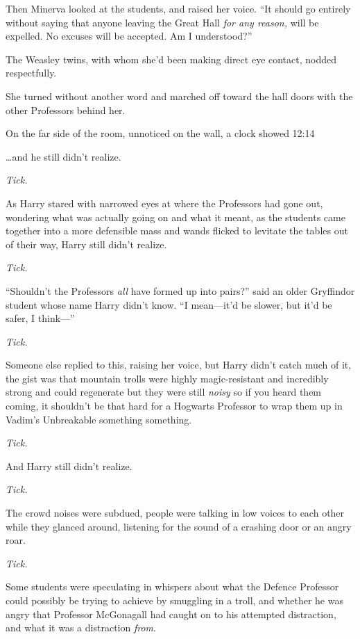 Then Minerva looked at the students, and raised her voice. “It should go entirely without saying that anyone leaving the Great Hall \emph{for any reason,} will be expelled. No excuses will be accepted. Am I understood?”

The Weasley twins, with whom she’d been making direct eye contact, nodded respectfully.

She turned without another word and marched off toward the hall doors with the other Professors behind her.

On the far side of the room, unnoticed on the wall, a clock showed 12:14\pm

\later

…and he still didn’t realize.

\emph{Tick.}

As Harry stared with narrowed eyes at where the Professors had gone out, wondering what was actually going on and what it meant, as the students came together into a more defensible mass and wands flicked to levitate the tables out of their way, Harry still didn’t realize.

\emph{Tick.}

“Shouldn’t the Professors \emph{all} have formed up into pairs?” said an older Gryffindor student whose name Harry didn’t know. “I mean—it’d be slower, but it’d be safer, I think—”

\emph{Tick.}

Someone else replied to this, raising her voice, but Harry didn’t catch much of it, the gist was that mountain trolls were highly magic-resistant and incredibly strong and could regenerate but they were still \emph{noisy} so if you heard them coming, it shouldn’t be that hard for a Hogwarts Professor to wrap them up in Vadim’s Unbreakable something something.

\emph{Tick.}

And Harry still didn’t realize.

\emph{Tick.}

The crowd noises were subdued, people were talking in low voices to each other while they glanced around, listening for the sound of a crashing door or an angry roar.

\emph{Tick.}

Some students were speculating in whispers about what the Defence Professor could possibly be trying to achieve by smuggling in a troll, and whether he was angry that Professor McGonagall had caught on to his attempted distraction, and what it was a distraction \emph{from}.


